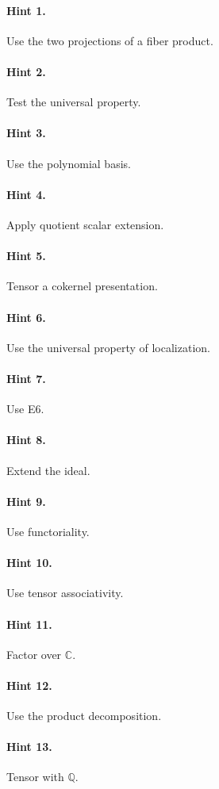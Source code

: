 \paragraph{Hint 1.} Use the two projections of a fiber product.
\paragraph{Hint 2.} Test the universal property.
\paragraph{Hint 3.} Use the polynomial basis.
\paragraph{Hint 4.} Apply quotient scalar extension.
\paragraph{Hint 5.} Tensor a cokernel presentation.
\paragraph{Hint 6.} Use the universal property of localization.
\paragraph{Hint 7.} Use E6.
\paragraph{Hint 8.} Extend the ideal.
\paragraph{Hint 9.} Use functoriality.
\paragraph{Hint 10.} Use tensor associativity.
\paragraph{Hint 11.} Factor over $\mathbb C$.
\paragraph{Hint 12.} Use the product decomposition.
\paragraph{Hint 13.} Tensor with $\mathbb Q$.
